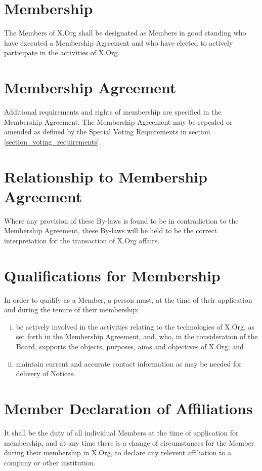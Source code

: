 \documentclass[10pt, english]{bylaws}
\begin{document}

\section{Membership}
The Members of X.Org shall be designated as Members in good standing who have
executed a Membership Agreement and who have elected to actively participate in
the activities of X.Org.

\section{Membership Agreement}
Additional requirements and rights of membership are specified in the Membership
Agreement. The Membership Agreement may be repealed or amended as defined by
the Special Voting Requirements in section \ref{section_voting_requirements}.

\section{Relationship to Membership Agreement}
Where any provision of these By-laws is found to be in contradiction to the
Membership Agreement, these By-laws will be held to be the correct
interpretation for the transaction of X.Org affairs.

\section{Qualifications for Membership}
In order to qualify as a Member, a person must, at the time of their application
and during the tenure of their membership:

\begin{enumerate}[(i)\hspace{.2cm}]
	\item be actively involved in the activities relating to the
	technologies of X.Org, as set forth in the Membership Agreement, and,
	who, in the consideration of the Board, supports the objects, purposes,
	aims and objectives of X.Org; and

	\item maintain current and accurate contact information as may be needed
	for delivery of Notices.
\end{enumerate}

\section{Member Declaration of Affiliations}
It shall be the duty of all individual Members at the time of application for
membership, and at any time there is a change of circumstances for the Member
during their membership in X.Org, to declare any relevent affiliation to a
company or other institution.
\end{document}
